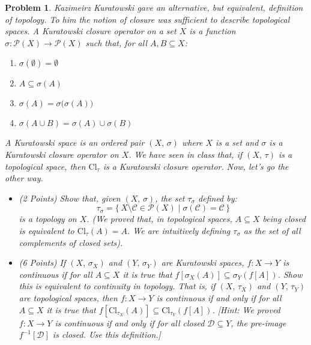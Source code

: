 \documentclass{article}
\theoremstyle{normal}
\newtheorem{problem}{Problem}
\begin{document}
    \begin{problem}
        Kazimeirz Kuratowski gave an alternative, but equivalent, definition
        of topology. To him the notion of \textit{closure} was sufficient to
        describe topological spaces. A Kuratowski closure operator on a set
        $X$ is a function $\sigma:\mathcal{P}(X)\rightarrow\mathcal{P}(X)$
        such that, for all $A,B\subseteq{X}$:
        \begin{enumerate}
            \item $\sigma(\emptyset)=\emptyset$
            \item $A\subseteq{\sigma}(A)$
            \item $\sigma(A)=\sigma\big(\sigma(A)\big)$
            \item $\sigma(A\cup{B})=\sigma(A)\cup\sigma(B)$
        \end{enumerate}
        A Kuratowski space is an ordered pair $(X,\,\sigma)$ where $X$ is a set
        and $\sigma$ is a Kuratowski closure operator on $X$. We have seen in
        class that, if $(X,\,\tau)$ is a topological space, then
        $\textrm{Cl}_{\tau}$ is a Kuratowski closure operator. Now, let's go
        the other way.
        \begin{itemize}
            \item (2 Points) Show that, given $(X,\,\sigma)$, the set
                $\tau_{\sigma}$ defined by:
                \begin{equation}
                    \tau_{\sigma}=\{\,X\setminus\mathcal{C}\in\mathcal{P}(X)
                        \;|\;\sigma(\mathcal{C})=\mathcal{C}\,\}
                \end{equation}
                is a topology on $X$. (We proved that, in topological spaces,
                $A\subseteq{X}$ being closed is equivalent to
                $\textrm{Cl}_{\tau}(A)=A$. We are
                intuitively defining $\tau_{\sigma}$ as the set of all
                \textit{complements of closed sets}).
            \item (6 Points) If $(X,\,\sigma_{X})$ and $(Y,\,\sigma_{Y})$ are
                Kuratowski spaces, $f:X\rightarrow{Y}$ is continuous if for all
                $A\subseteq{X}$ it is true that
                $f[\sigma_{X}(A)]\subseteq\sigma_{Y}(f[A])$. Show this is
                equivalent to continuity in topology. That is, if
                $(X,\,\tau_{X})$ and $(Y,\,\tau_{Y})$ are topological spaces,
                then $f:X\rightarrow{Y}$ is continuous if and only if
                for all $A\subseteq{X}$ it is true that
                $f[\textrm{Cl}_{\tau_{X}}(A)]\subseteq\textrm{Cl}_{\tau_{Y}}(f[A])$.
                [Hint: We proved $f:X\rightarrow{Y}$ is continuous if and only
                if for all closed $\mathcal{D}\subseteq{Y}$, the pre-image
                $f^{-1}[\mathcal{D}]$ is closed. Use this definition.]
        \end{itemize}
    \end{problem}
\end{document}
